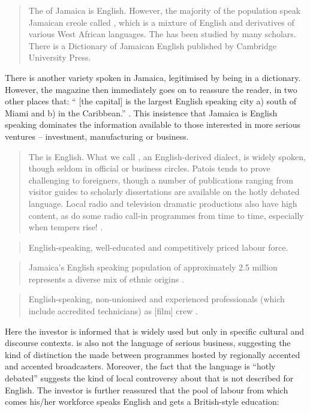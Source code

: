 \begin{quote}
	The  of Jamaica is English. However, the majority of the population speak Jamaican creole called , which is a mixture of English and derivatives of various West African languages. The  has been studied by many scholars. There is a Dictionary of Jamaican English published by Cambridge University Press.
\end{quote}

There is another variety spoken in Jamaica, legitimised by being in a dictionary.  However, the magazine then immediately goes on to reassure the reader, in two other places that: “ [the capital] is the largest English speaking city a) south of Miami and b) in the Caribbean.” \citep[2--3]{JAMPRO1997b}.  This insistence that Jamaica is English speaking dominates the information available to those interested in more serious ventures -- investment, manufacturing or business.

\begin{quote}
	The  is English.  What we call , an English-derived dialect, is widely spoken, though seldom in official or business circles.  Patois tends to prove challenging to foreigners, though a number of publications ranging from visitor guides to scholarly dissertations are available on the hotly debated language.  Local radio and television dramatic productions also have high  content, as do some radio call-in programmes from time to time, especially when tempers rise! \citep{JAMPRO1997}.
\end{quote}

\begin{quote}
	English-speaking, well-educated and competitively priced labour force\linebreak\citep{JAMPRO1993}. 
\end{quote}

\begin{quote}
	Jamaica’s English speaking population of approximately 2.5 million represents a diverse mix of ethnic origins \citep[15]{JAMPRO1994}.
\end{quote}

\begin{quote}
	English-speaking, non-unionised and experienced professionals (which include accredited technicians) as [film] crew \citep[5]{JAMPRO1993}.
\end{quote}

Here the investor is informed that  is widely used but only in specific cultural and discourse contexts.   is also not the language of serious business, suggesting the kind of distinction the  made between programmes hosted by regionally accented and  accented broadcasters.  Moreover, the fact that the language is “hotly debated” suggests the kind of local controversy about  that is not described for English.  The investor is further reassured that the pool of labour from which comes his\slash her workforce speaks English and gets a British-style education:


